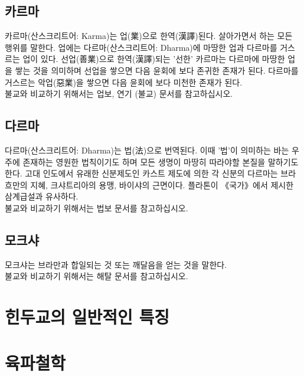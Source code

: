 \documentclass[12pt, a4paper, oneside]{book}
\let\stdsection\section
\renewcommand\section{\newpage\stdsection}
\begin{document}
\subsection{카르마}
카르마(산스크리트어: Karma)는 업(業)으로 한역(漢譯)된다. 
살아가면서 하는 모든 행위를 말한다. 
업에는 다르마(산스크리트어: Dharma)에 마땅한 업과 다르마를 거스르는 업이 있다. 
선업(善業)으로 한역(漢譯)되는 '선한' 카르마는 다르마에 마땅한 업을 쌓는 것을 의미하며 선업을 쌓으면 다음 윤회에 보다 존귀한 존재가 된다. 
다르마를 거스르는 악업(惡業)을 쌓으면 다음 윤회에 보다 미천한 존재가 된다.\\
불교와 비교하기 위해서는 업보, 연기 (불교) 문서를 참고하십시오.

\subsection{다르마}
다르마(산스크리트어: Dharma)는 법(法)으로 번역된다. 
이때 '법'이 의미하는 바는 우주에 존재하는 영원한 법칙이기도 하며 모든 생명이 마땅히 따라야할 본질을 말하기도 한다.
고대 인도에서 유래한 신분제도인 카스트 제도에 의한 각 신분의 다르마는 브라흐만의 지혜, 크샤트리아의 용맹, 바이샤의 근면이다. 
플라톤이 《국가》에서 제시한 삼계급설과 유사하다.\\
불교와 비교하기 위해서는 법보 문서를 참고하십시오.

\subsection{모크샤}
모크샤는 브라만과 합일되는 것 또는 깨달음을 얻는 것을 말한다.\\
불교와 비교하기 위해서는 해탈 문서를 참고하십시오.





%
	\section{힌두교의 일반적인 특징}


%
	\section{육파철학}
\end{document}
